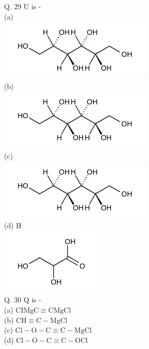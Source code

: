 \documentclass[10pt]{article}
\begin{document}
Q. 29 U is -\\
(a)\\
\includegraphics{smile-e241dc6cb0af1ebbceaf6dcd0092caa23c548b93}\\
(b)\\
\includegraphics{smile-f45b5eb3dfa8df5d7f5eba8b0804d3e9fae84a2d}\\
(c)\\
\includegraphics{smile-bd8c94628c0583becceecf09ceed0d892e02c110}\\
(d) H\\
\includegraphics{smile-c6ad2eff7f50ae4af3b8db81295598ab06b6dfa7}\\
Q. 30 Q is -\\
(a) $\mathrm{CIMgC} \equiv \mathrm{CMgCl}$\\
(b) $\mathrm{CH} \equiv \mathrm{C}-\mathrm{MgCl}$\\
(c) $\mathrm{Cl}-\mathrm{O}-\mathrm{C} \equiv \mathrm{C}-\mathrm{MgCl}$\\
(d) $\mathrm{Cl}-\mathrm{O}-\mathrm{C} \equiv \mathrm{C}-\mathrm{OCl}$
\end{document}
